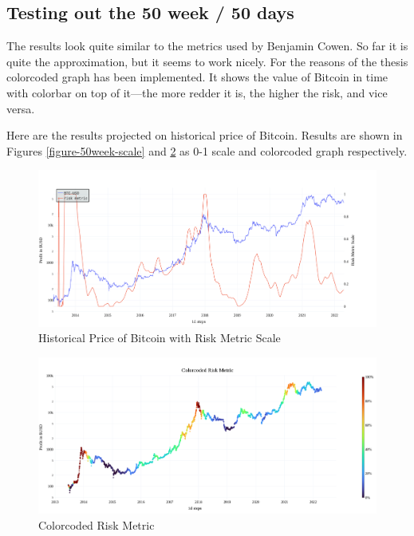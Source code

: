 \subsection*{Testing out the 50 week / 50 days}
The results look quite similar to the metrics used by Benjamin Cowen. So far it is quite the approximation, but it seems to work nicely. For the reasons of the thesis colorcoded graph has been implemented. It shows the value of Bitcoin in time with colorbar on top of it---the more redder it is, the higher the risk, and vice versa.

Here are the results projected on historical price of Bitcoin. Results are shown in Figures \ref{figure-50week-scale} and \ref{figure-50week-colorcoded} as 0-1 scale and colorcoded graph respectively.

\begin{figure}[ht]
    \centering
    \includegraphics[width=\columnwidth]{figures/50week-scale.png}
    \caption{Historical Price of Bitcoin with Risk Metric Scale}
    \label{figure-50week-colorcoded}
\end{figure}

\begin{figure}[ht]
    \centering
    \includegraphics[width=\columnwidth]{figures/50week-colorcoded.png}
    \caption{Colorcoded Risk Metric}
    \label{figure-50week-colorcoded}
\end{figure}

